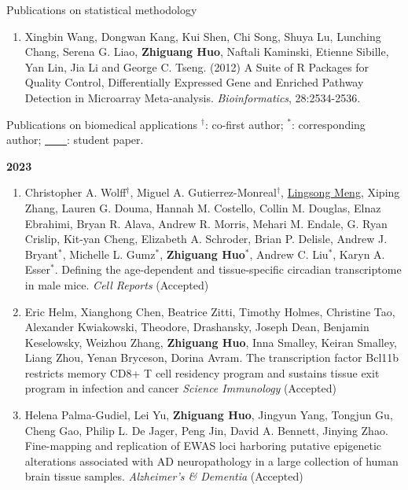 \documentclass{resume} %
\begin{document}
\begin{rSection}{Publications on statistical methodology}
\begin{enumerate}[noitemsep,topsep=0pt,resume]
    \item Xingbin Wang, Dongwan Kang, Kui Shen, Chi Song, Shuya Lu, Lunching Chang, Serena G. Liao, {\bf Zhiguang Huo}, Naftali Kaminski, Etienne Sibille, Yan Lin, Jia Li and George C. Tseng. (2012) A Suite of R Packages for Quality Control, Differentially Expressed Gene and Enriched Pathway Detection in Microarray Meta-analysis. \emph{Bioinformatics}, 28:2534-2536.

\end{enumerate}


\end{rSection}

\begin{rSection}{Publications on biomedical applications}
$^\dagger$: co-first author; $^*$: corresponding author; \underline{\mbox{ }\mbox{ }\mbox{ }\mbox{ }}: student paper.


\textbf{2023}
\begin{enumerate}[noitemsep,topsep=0pt, resume]

\item 
Christopher A. Wolff$^\dagger$, Miguel A. Gutierrez-Monreal$^\dagger$, \underline{Lingsong Meng}, Xiping Zhang, Lauren G. Douma, Hannah M. Costello, Collin M. Douglas, Elnaz Ebrahimi, Bryan R. Alava, Andrew R. Morris, Mehari M. Endale, G. Ryan Crislip, Kit-yan Cheng, Elizabeth A. Schroder, Brian P. Delisle, Andrew J. Bryant$^*$, Michelle L. Gumz$^*$, {\bf Zhiguang Huo}$^*$, Andrew C. Liu$^*$, Karyn A. Esser$^*$.
Defining the age-dependent and tissue-specific circadian transcriptome in male mice.
\emph{Cell Reports} (Accepted)

\item
Eric Helm, Xianghong Chen, Beatrice Zitti, Timothy Holmes, Christine Tao, Alexander Kwiakowski, Theodore, Drashansky, Joseph Dean, Benjamin Keselowsky, Weizhou Zhang,  {\bf Zhiguang Huo}, Inna Smalley, Keiran Smalley, Liang Zhou, Yenan Bryceson, Dorina Avram.
The transcription factor Bcl11b restricts memory CD8+ T cell residency program and sustains tissue exit program in infection and cancer
\emph{Science Immunology} (Accepted)

\item
Helena Palma-Gudiel, Lei Yu, {\bf Zhiguang Huo}, Jingyun Yang, Tongjun Gu, Cheng Gao, Philip L. De Jager, Peng Jin, David A. Bennett, Jinying Zhao.
Fine-mapping and replication of EWAS loci harboring putative epigenetic alterations associated with AD neuropathology in a large collection of human brain tissue samples. 
\emph{Alzheimer's \& Dementia} (Accepted)



\end{enumerate}
\end{rSection}
\end{document}
